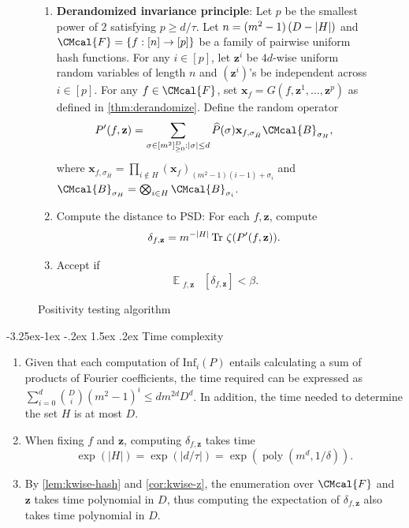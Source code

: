 \documentclass[11pt]{article}
\makeatletter
\renewcommand{\subsection}{\@startsection{subsection}{2}{\z@}%
             {-3.25ex\@plus -1ex \@minus -.2ex}%
             {1.5ex \@plus .2ex}%
             {\normalfont\large\scshape\bfseries}}
\def\B{\CMcal{B}}
\def\F{\CMcal{F}}
\theoremstyle{plain}
\theoremstyle{definition}
\newcommand {\minusspace} {\: \! \!}
\newcommand {\Fn} [2] {\ensuremath{ #1 \minusspace \Br{ #2 } }}
\newcommand {\set} [1] {\ensuremath{ \left\lbrace #1 \right\rbrace }}
\newcommand {\br} [1] {\ensuremath{ \left( #1 \right) }}
\newcommand {\Br} [1] {\ensuremath{ \left[ #1 \right] }}
\newcommand {\ab} [1] {\ensuremath{ \left| #1 \right| }}
\DeclarePairedDelimiter{\abs}{\lvert}{\rvert}
\DeclareMathOperator*{\bigE}{\mathbb{E}}
\newcommand {\expec} [2] {\Fn{\bigE_{\substack{#1}}}{#2}}
\newcommand {\Tr} {\ensuremath{ \mathrm{Tr} }}
\newenvironment{Algorithm}{\begin{framed}}{\end{framed}}
\newcommand{\randz}{\ensuremath{\mathbf{z}}}
\newcommand{\randx}{\ensuremath{\mathbf{x}}}
\newcommand{\infi}[1]{\ensuremath{\mathrm{Inf}_i}\br{#1}}
\newcommand{\poly} {\ensuremath{\operatorname{poly}}}
\newcommand{\dlbo} {\ensuremath{{D}}}
\newcommand{\dldd} {\ensuremath{{d}}}
\newcommand{\1}{\mathbb{1}} %
\makeatother
\begin{document}
\begin{figure}
\begin{Algorithm}
\begin{description}
\begin{enumerate}
                For each $i$, compute the influence
                $\infi{P}=\sum_{\sigma: \sigma_i\neq 0}\widehat{P}(\sigma)^2$.
                Let $H=\set{i: \infi{P}>\tau}$.
          \item \textbf{Derandomized invariance principle}:
                Let $p$ be the smallest power of $2$ satisfying $p\ge\dldd/\tau$.
                Let $n=(m^2-1)\br{\dlbo-\abs{H}}$ and $\F=\set{f: [n]\to[p]}$ be a family of pairwise uniform hash functions.
                For any $i\in[p]$, let $\randz^i$ be $4d$-wise uniform random variables of length $n$ and $\br{\randz^i}$'s be independent across $i\in[p]$. 
                For any $f\in\F$, set $\randx_f=G\br{f,\randz^1,\dots,\randz^p}$ as defined in \cref{thm:derandomize}. Define the random operator
                \begin{equation}\label{eq:operator-after-derandomization}
                 P^\prime(f, \randz) = \sum_{\sigma\in[m^2]_{\ge 0}^{\dlbo}:\ab{\sigma}\le d}\widehat{P}(\sigma)\randx_{f,\sigma_{\bar{H}}}\B_{\sigma_H},
                \end{equation}
                where $\randx_{f,\sigma_{\bar{H}}} = \prod_{i\notin H}\br{\randx_f}_{(m^2-1)(i-1)+\sigma_i}$ and $\B_{\sigma_H}=\bigotimes_{i\in H}\B_{\sigma_i}$.
          \item Compute the distance to PSD: For each $f, \randz$, compute
                $$\delta_{f, \randz} = {m^{-\abs{H}}}\,\Tr~\zeta(P^\prime(f, \randz)).$$
          \item Accept if
                $$\expec{f, \randz}{\delta_{f, \randz}}<\beta.$$
        \end{enumerate}
\end{description}
\end{Algorithm}
\caption{Positivity testing algorithm}\label{fig:ptalg}
\end{figure}

\subsection{Time complexity}
\begin{enumerate}
  \item 
  Given that each computation of $\infi{P}$ entails calculating a sum of products of Fourier coefficients, the time required can be expressed as $\sum_{i=0}^d{\binom{\dlbo}{i}}\br{m^2-1}^i \le dm^{2d}\dlbo^d$. In addition, the time needed to determine the set $H$ is at most $\dlbo$.
 

  \item 
        When fixing $f$ and $\randz$, computing $\delta_{f, \randz}$ takes time
        $$\exp\br{\ab{H}} = \exp\br{\ab{d/\tau}} =\exp\br{\poly\br{m^d, 1/\delta}}.$$
        
  \item By \cref{lem:kwise-hash} and \cref{cor:kwise-z}, the enumeration over $\F$ and $\randz$ takes time polynomial in $\dlbo$, thus computing the expectation of $\delta_{f, \randz}$ also takes time polynomial in $\dlbo$.
\end{enumerate}
\end{document}
